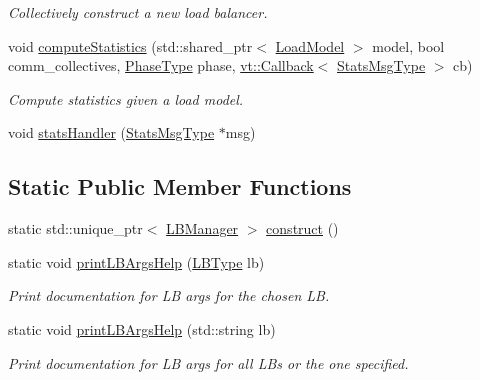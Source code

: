 \begin{DoxyCompactItemize}
\begin{DoxyCompactList}\small\item\em Collectively construct a new load balancer. \end{DoxyCompactList}\item 
void \hyperlink{structvt_1_1vrt_1_1collection_1_1balance_1_1_l_b_manager_a11affdf8bb17ff6d2906c7342285d6ec}{compute\+Statistics} (std\+::shared\+\_\+ptr$<$ \hyperlink{structvt_1_1vrt_1_1collection_1_1balance_1_1_load_model}{Load\+Model} $>$ model, bool comm\+\_\+collectives, \hyperlink{namespacevt_a46ce6733d5cdbd735d561b7b4029f6d7}{Phase\+Type} phase, \hyperlink{namespacevt_a36db99df4c973d48b1118a293fff533f}{vt\+::\+Callback}$<$ \hyperlink{structvt_1_1vrt_1_1collection_1_1balance_1_1_l_b_manager_afedd89b1c2db43f087c1757db6200d36}{Stats\+Msg\+Type} $>$ cb)
\begin{DoxyCompactList}\small\item\em Compute statistics given a load model. \end{DoxyCompactList}\item 
void \hyperlink{structvt_1_1vrt_1_1collection_1_1balance_1_1_l_b_manager_ac068db6bbf9109fc15786b1298279f87}{stats\+Handler} (\hyperlink{structvt_1_1vrt_1_1collection_1_1balance_1_1_l_b_manager_afedd89b1c2db43f087c1757db6200d36}{Stats\+Msg\+Type} $\ast$msg)
\end{DoxyCompactItemize}
\subsection*{Static Public Member Functions}
\begin{DoxyCompactItemize}
\item 
static std\+::unique\+\_\+ptr$<$ \hyperlink{structvt_1_1vrt_1_1collection_1_1balance_1_1_l_b_manager}{L\+B\+Manager} $>$ \hyperlink{structvt_1_1vrt_1_1collection_1_1balance_1_1_l_b_manager_ae8e69a0540bb87b40ee86d2c1fe31cd5}{construct} ()
\item 
static void \hyperlink{structvt_1_1vrt_1_1collection_1_1balance_1_1_l_b_manager_a313786fd69d0687572b0465e37acb9aa}{print\+L\+B\+Args\+Help} (\hyperlink{namespacevt_1_1vrt_1_1collection_1_1balance_ac4f99693509affcc67db182d4aad9b5c}{L\+B\+Type} lb)
\begin{DoxyCompactList}\small\item\em Print documentation for LB args for the chosen LB. \end{DoxyCompactList}\item 
static void \hyperlink{structvt_1_1vrt_1_1collection_1_1balance_1_1_l_b_manager_a53276c3cae8d6c50305d8940ee983ebf}{print\+L\+B\+Args\+Help} (std\+::string lb)
\begin{DoxyCompactList}\small\item\em Print documentation for LB args for all L\+Bs or the one specified. \end{DoxyCompactList}\end{DoxyCompactItemize}
